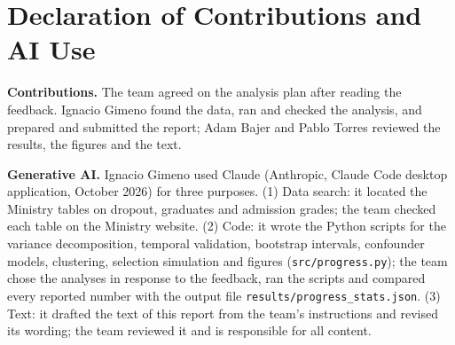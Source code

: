 \documentclass[clean]{bam-progress}
\begin{document}
\section*{Declaration of Contributions and AI Use}

\textbf{Contributions.} The team agreed on the analysis plan after reading the feedback. Ignacio Gimeno found the data, ran and checked the analysis, and prepared and submitted the report; Adam Bajer and Pablo Torres reviewed the results, the figures and the text.

\textbf{Generative AI.} Ignacio Gimeno used Claude (Anthropic, Claude Code desktop application, October 2026) for three purposes. (1) Data search: it located the Ministry tables on dropout, graduates and admission grades; the team checked each table on the Ministry website. (2) Code: it wrote the Python scripts for the variance decomposition, temporal validation, bootstrap intervals, confounder models, clustering, selection simulation and figures (\texttt{src/progress.py}); the team chose the analyses in response to the feedback, ran the scripts and compared every reported number with the output file \texttt{results/progress\_stats.json}. (3) Text: it drafted the text of this report from the team's instructions and revised its wording; the team reviewed it and is responsible for all content.
\end{document}

